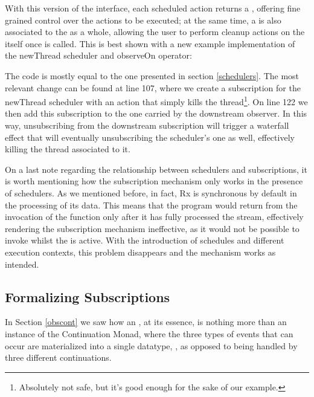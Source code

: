 
With this version of the interface, each scheduled action returns a , offering fine grained control over the actions to be executed; at the same time, a  is also associated to the  as a whole, allowing the user to perform cleanup actions on the  itself once  is called. This is best shown with a new example implementation of the newThread scheduler and observeOn operator:


The code is mostly equal to the one presented in section \ref{schedulers}. The most relevant change can be found at line 107, where we create a subscription for the newThread scheduler with an action that simply kills the thread\footnote{Absolutely not safe, but it's good enough for the sake of our example.}. On line 122 we then add this subscription to the one carried by the downstream observer. In this way, unsubscribing from the downstream subscription will trigger a waterfall effect that will eventually unsubscribing the scheduler's one as well, effectively killing the thread associated to it.

On a last note regarding the relationship between schedulers and subscriptions, it is worth mentioning how the subscription mechanism only works in the presence of schedulers. As we mentioned before, in fact, Rx is synchronous by default in the processing of its data. This means that the program would return from the invocation of the  function only after it has fully processed the stream, effectively rendering the subscription mechanism ineffective, as it would not be possible to invoke  whilst the  is active. With the introduction of schedules and different execution contexts, this problem disappears and the mechanism works as intended.

\subsection{Formalizing Subscriptions}

In Section \ref{obscont} we saw how an , at its essence, is nothing more than an instance of the Continuation Monad, where the three types of events that can occur are materialized into a single datatype, , as opposed to being handled by three different continuations.

